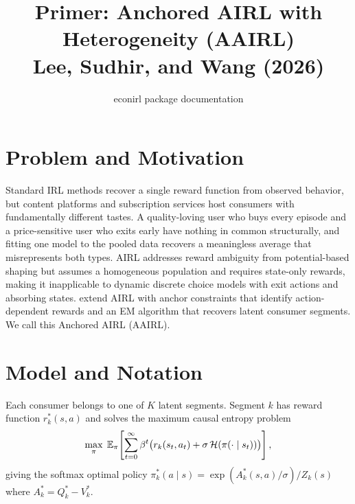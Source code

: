 \documentclass[11pt]{article}
\title{Primer: Anchored AIRL with Heterogeneity (AAIRL)\\
\large Lee, Sudhir, and Wang (2026)}
\author{econirl package documentation}
\date{}
\begin{document}
\maketitle

\section{Problem and Motivation}

Standard IRL methods recover a single reward function from observed behavior, but content platforms and subscription services host consumers with fundamentally different tastes. A quality-loving user who buys every episode and a price-sensitive user who exits early have nothing in common structurally, and fitting one model to the pooled data recovers a meaningless average that misrepresents both types. AIRL \citep{fu2018} addresses reward ambiguity from potential-based shaping but assumes a homogeneous population and requires state-only rewards, making it inapplicable to dynamic discrete choice models with exit actions and absorbing states. \citet{lee2026} extend AIRL with anchor constraints that identify action-dependent rewards and an EM algorithm that recovers latent consumer segments. We call this Anchored AIRL (AAIRL).

\section{Model and Notation}

\commonnotation

Each consumer belongs to one of $K$ latent segments. Segment $k$ has reward function $r^*_k(s,a)$ and solves the maximum causal entropy problem
\begin{equation}
\label{eq:mce}
\max_\pi \; \mathbb{E}_\pi\!\left[\sum_{t=0}^{\infty} \beta^t \big(r_k(s_t, a_t) + \sigma\, \mathcal{H}(\pi(\cdot \mid s_t))\big)\right],
\end{equation}
giving the softmax optimal policy $\pi^*_k(a \mid s) = \exp(A^*_k(s,a)/\sigma) / Z_k(s)$ where $A^*_k = Q^*_k - V^*_k$.
\end{document}
